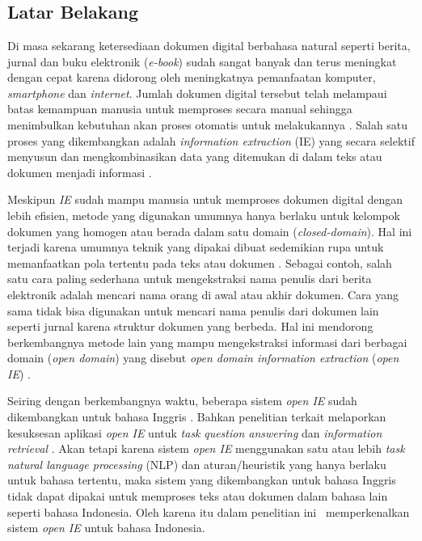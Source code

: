 \chapter{\babSatu}
\label{chap:babSatu}

\section{Latar Belakang}
Di masa sekarang ketersediaan dokumen digital berbahasa natural seperti berita, jurnal dan buku elektronik (\textit{e-book}) sudah sangat banyak dan terus meningkat dengan cepat karena didorong oleh meningkatnya pemanfaatan komputer, \textit{smartphone} dan \textit{internet}. Jumlah dokumen digital tersebut telah melampaui batas kemampuan manusia untuk memproses secara manual sehingga menimbulkan kebutuhan akan proses otomatis untuk melakukannya \citep{banko2007open}. Salah satu proses yang dikembangkan adalah \textit{information extraction} (IE) yang secara selektif menyusun dan mengkombinasikan data yang ditemukan di dalam teks atau dokumen menjadi informasi \citep{cowie1996information}.

Meskipun \textit{IE} sudah mampu manusia untuk memproses dokumen digital dengan lebih efisien, metode yang digunakan umumnya hanya berlaku untuk kelompok dokumen yang homogen atau berada dalam satu domain (\textit{closed-domain}). Hal ini terjadi karena umumnya teknik yang dipakai dibuat sedemikian rupa untuk memanfaatkan pola tertentu pada teks atau dokumen \citep{cowie1996information}. Sebagai contoh, salah satu cara paling sederhana untuk mengekstraksi nama penulis dari berita elektronik adalah mencari nama orang di awal atau akhir dokumen. Cara yang sama tidak bisa digunakan untuk mencari nama penulis dari dokumen lain seperti jurnal karena struktur dokumen yang berbeda. Hal ini mendorong berkembangnya metode lain yang mampu mengekstraksi informasi dari berbagai domain (\textit{open domain}) yang disebut \textit{open domain information extraction} (\textit{open IE}) \citep{banko2007open}.

Seiring dengan berkembangnya waktu, beberapa sistem \textit{open IE} sudah dikembangkan untuk bahasa Inggris \citep{banko2007open,schmitz2012open,angeli2015leveraging}. Bahkan penelitian terkait melaporkan kesuksesan aplikasi \textit{open IE} untuk \textit{task} \textit{question answering} \citep{fader2011identifying} dan \textit{information retrieval} \citep{etzioni2011search}. Akan tetapi karena sistem \textit{open IE} menggunakan satu atau lebih \textit{task natural language processing} (NLP) dan aturan/heuristik yang hanya berlaku untuk bahasa tertentu, maka sistem yang dikembangkan untuk bahasa Inggris tidak dapat dipakai untuk memproses teks atau dokumen dalam bahasa lain seperti bahasa Indonesia. Oleh karena itu dalam penelitian ini \saya~memperkenalkan sistem \textit{open IE} untuk bahasa Indonesia.

